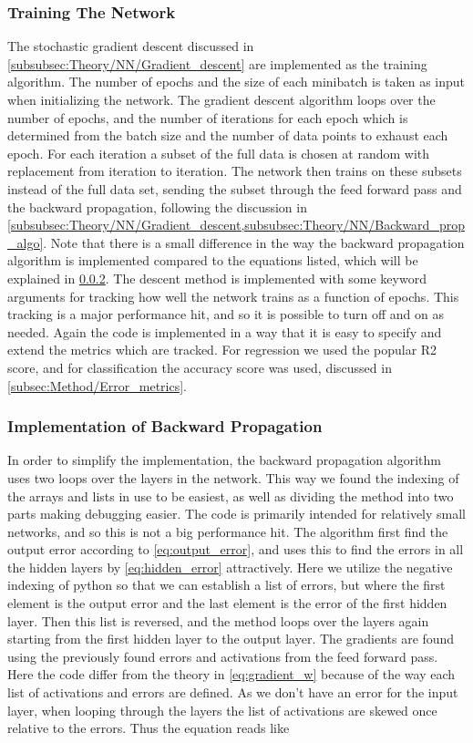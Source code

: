 \documentclass[10pt, twocolumn]{article}
\begin{document}
\subsubsection{Training The Network}
\label{subsubsec:Method/NN/training}
The stochastic gradient descent discussed in \cref{subsubsec:Theory/NN/Gradient_descent} are implemented as the training algorithm. The number of epochs and the size of each minibatch is taken as input when initializing the network. The gradient descent algorithm loops over the number of epochs, and the number of iterations for each epoch which is determined from the batch size and the number of data points to exhaust each epoch. For each iteration a subset of the full data is chosen at random with replacement from iteration to iteration. The network then trains on these subsets instead of the full data set, sending the subset through the feed forward pass and the backward propagation, following the discussion in \cref{subsubsec:Theory/NN/Gradient_descent,subsubsec:Theory/NN/Backward_prop_algo}. Note that there is a small difference in the way the backward propagation algorithm is implemented compared to the equations listed, which will be explained in \cref{subsubsec:Method/Implementation_backprop}. The descent method is implemented with some keyword arguments for tracking how well the network trains as a function of epochs. This tracking is a major performance hit, and so it is possible to turn off and on as needed. Again the code is implemented in a way that it is easy to specify and extend the metrics which are tracked. For regression we used the popular R2 score, and for classification the accuracy score was used, discussed in \cref{subsec:Method/Error_metrics}.

\subsubsection{Implementation of Backward Propagation}
\label{subsubsec:Method/Implementation_backprop}
In order to simplify the implementation, the backward propagation algorithm uses two loops over the layers in the network. This way we found the indexing of the arrays and lists in use to be easiest, as well as dividing the method into two parts making debugging easier. The code is primarily intended for relatively small networks, and so this is not a big performance hit.  The algorithm first find the output error according to \cref{eq:output_error}, and uses this to find the errors in all the hidden layers by \cref{eq:hidden_error} attractively. Here we utilize the negative indexing of python so that we can establish a list of errors, but where the first element is the output error and the last element is the error of the first hidden layer. Then this list is reversed, and the method loops over the layers again starting from the first hidden layer to the output layer. The gradients are found using the previously found errors and activations from the feed forward pass. Here the code differ from the theory in \cref{eq:gradient_w} because of the way each list of activations and errors are defined. As we don't have an error for the input layer, when looping through the layers the list of activations are skewed once relative to the errors. Thus the equation reads like
\end{document}

